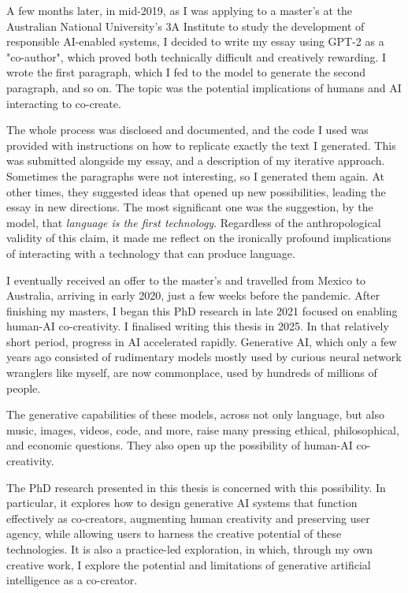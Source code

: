 A few months later, in mid-2019, as I was applying to a master's at the Australian National University's 3A Institute to study the development of responsible AI-enabled systems, I decided to write my essay using GPT-2 as a "co-author", which proved both technically difficult and creatively rewarding. I wrote the first paragraph, which I fed to the model to generate the second paragraph, and so on. The topic was the potential implications of humans and AI interacting to co-create.

The whole process was disclosed and documented, and the code I used was provided with instructions on how to replicate exactly the text I generated. This was submitted alongside my essay, and a description of my iterative approach. Sometimes the paragraphs were not interesting, so I generated them again. At other times, they suggested ideas that opened up new possibilities, leading the essay in new directions. The most significant one was the suggestion, by the model, that \textit{language is the first technology}. Regardless of the anthropological validity of this claim, it made me reflect on the ironically profound implications of interacting with a technology that can produce language.

I eventually received an offer to the master's and travelled from Mexico to Australia, arriving in early 2020, just a few weeks before the pandemic. After finishing my masters, I began this PhD research in late 2021 focused on enabling human-AI co-creativity. I finalised writing this thesis in 2025. In that relatively short period, progress in AI accelerated rapidly. Generative AI, which only a few years ago consisted of rudimentary models mostly used by curious neural network wranglers like myself, are now commonplace, used by hundreds of millions of people.

The generative capabilities of these models, across not only language, but also music, images, videos, code, and more, raise many pressing ethical, philosophical, and economic questions. They also open up the possibility of human-AI co-creativity.

The PhD research presented in this thesis is concerned with this possibility. In particular, it explores how to design generative AI systems that function effectively as co-creators, augmenting human creativity and preserving user agency, while allowing users to harness the creative potential of these technologies. It is also a practice-led exploration, in which, through my own creative work, I explore the potential and limitations of generative artificial intelligence as a co-creator. 


